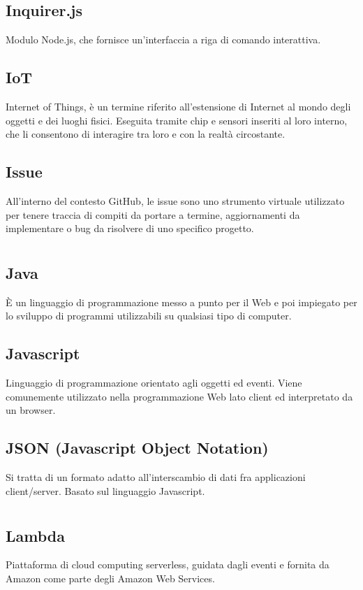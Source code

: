 	\subsection*{Inquirer.js}
	Modulo Node.js, che fornisce un'interfaccia a riga di comando interattiva.
	\subsection*{IoT}
	Internet of Things, è un termine riferito all’estensione di Internet al mondo degli oggetti e dei luoghi fisici. Eseguita tramite chip e sensori inseriti al loro interno, che li consentono di interagire tra loro e con la realtà circostante.
	\subsection*{Issue}
	All'interno del contesto GitHub, le issue sono uno strumento virtuale utilizzato per tenere traccia di compiti da portare a termine, aggiornamenti da implementare o bug da risolvere di uno specifico progetto.
\pagebreak
\section[J]{}
	\subsection*{Java}
	È un linguaggio di programmazione messo a punto per il Web e poi impiegato per lo sviluppo di programmi utilizzabili su qualsiasi tipo di computer.
	\subsection*{Javascript}
	Linguaggio di programmazione orientato agli oggetti ed eventi. Viene comunemente utilizzato nella programmazione Web lato client ed interpretato da un browser.
	\subsection*{JSON (Javascript Object Notation)}
	Si tratta di un formato adatto all’interscambio di dati fra applicazioni client/server. Basato sul linguaggio Javascript. 
\pagebreak
\section[L]{}
	\subsection*{Lambda}
	Piattaforma di cloud computing serverless, guidata dagli eventi e fornita da Amazon come parte degli Amazon Web Services.
